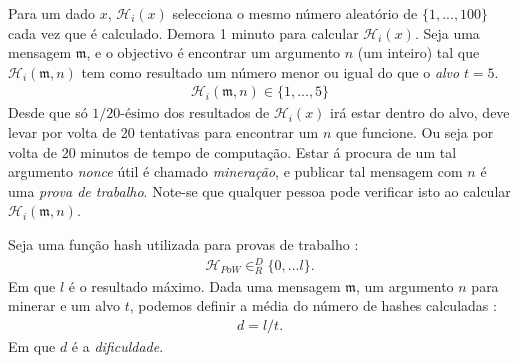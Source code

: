 Para um dado $x$, $\mathcal{H}_i(x)$ selecciona o mesmo número aleatório de $\{1,...,100\}$ cada vez que é calculado. Demora 1 minuto para calcular $\mathcal{H}_i(x)$.
Seja uma mensagem $\mathfrak{m}$, e o objectivo é encontrar um argumento $n$ (um inteiro)
tal que $\mathcal{H}_i(\mathfrak{m},n)$ tem como resultado um número menor ou igual do que o {\em alvo} $t = 5$.
\begin{align*}
\mathcal{H}_i(\mathfrak{m},n) \in \{1,...,5\}
\end{align*}
Desde que só $1/20\textrm{-ésimo}$ dos resultados de $\mathcal{H}_i(x)$ irá estar dentro do alvo, deve levar por volta de 20 tentativas para encontrar um $n$ que funcione. Ou seja por volta de 20 minutos de tempo de computação.   
Estar á procura de um tal argumento {\em nonce} útil é chamado {\em mineração}, e publicar tal mensagem com $n$ é uma {\em prova de trabalho}. Note-se que qualquer pessoa pode verificar isto ao calcular $\mathcal{H}_i(\mathfrak{m},n)$. 


Seja uma função hash utilizada para provas de trabalho :
\begin{align*}
\mathcal{H}_{PoW} \in^D_R \{0,...l\} .
\end{align*}
Em que $l$ é o resultado máximo. Dada uma mensagem $\mathfrak{m}$, um argumento $n$ para minerar e um alvo $t$, podemos definir a média do número de hashes calculadas :
\begin{align*}
d = l/t .
\end{align*}
Em que $d$ é a {\em dificuldade}. 


